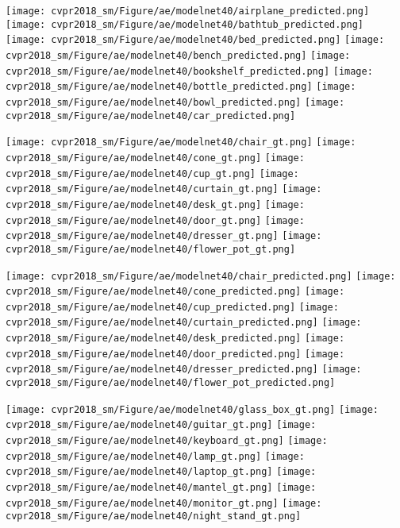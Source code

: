 \documentclass[10pt,twocolumn,letterpaper]{article}
\begin{document}
\begin{figure*}[t]
        \texttt{[image: cvpr2018\_sm/Figure/ae/modelnet40/airplane\_predicted.png]}
        \texttt{[image: cvpr2018\_sm/Figure/ae/modelnet40/bathtub\_predicted.png]}
        \texttt{[image: cvpr2018\_sm/Figure/ae/modelnet40/bed\_predicted.png]}
        \texttt{[image: cvpr2018\_sm/Figure/ae/modelnet40/bench\_predicted.png]}
        \texttt{[image: cvpr2018\_sm/Figure/ae/modelnet40/bookshelf\_predicted.png]}
        \texttt{[image: cvpr2018\_sm/Figure/ae/modelnet40/bottle\_predicted.png]}
        \texttt{[image: cvpr2018\_sm/Figure/ae/modelnet40/bowl\_predicted.png]}
        \texttt{[image: cvpr2018\_sm/Figure/ae/modelnet40/car\_predicted.png]}
        
        \texttt{[image: cvpr2018\_sm/Figure/ae/modelnet40/chair\_gt.png]}
        \texttt{[image: cvpr2018\_sm/Figure/ae/modelnet40/cone\_gt.png]}
        \texttt{[image: cvpr2018\_sm/Figure/ae/modelnet40/cup\_gt.png]}
        \texttt{[image: cvpr2018\_sm/Figure/ae/modelnet40/curtain\_gt.png]}
        \texttt{[image: cvpr2018\_sm/Figure/ae/modelnet40/desk\_gt.png]}
        \texttt{[image: cvpr2018\_sm/Figure/ae/modelnet40/door\_gt.png]}
        \texttt{[image: cvpr2018\_sm/Figure/ae/modelnet40/dresser\_gt.png]}
        \texttt{[image: cvpr2018\_sm/Figure/ae/modelnet40/flower\_pot\_gt.png]}
        
        \texttt{[image: cvpr2018\_sm/Figure/ae/modelnet40/chair\_predicted.png]}
        \texttt{[image: cvpr2018\_sm/Figure/ae/modelnet40/cone\_predicted.png]}
        \texttt{[image: cvpr2018\_sm/Figure/ae/modelnet40/cup\_predicted.png]}
        \texttt{[image: cvpr2018\_sm/Figure/ae/modelnet40/curtain\_predicted.png]}
        \texttt{[image: cvpr2018\_sm/Figure/ae/modelnet40/desk\_predicted.png]}
        \texttt{[image: cvpr2018\_sm/Figure/ae/modelnet40/door\_predicted.png]}
        \texttt{[image: cvpr2018\_sm/Figure/ae/modelnet40/dresser\_predicted.png]}
        \texttt{[image: cvpr2018\_sm/Figure/ae/modelnet40/flower\_pot\_predicted.png]}
        
        \texttt{[image: cvpr2018\_sm/Figure/ae/modelnet40/glass\_box\_gt.png]}
        \texttt{[image: cvpr2018\_sm/Figure/ae/modelnet40/guitar\_gt.png]}
        \texttt{[image: cvpr2018\_sm/Figure/ae/modelnet40/keyboard\_gt.png]}
        \texttt{[image: cvpr2018\_sm/Figure/ae/modelnet40/lamp\_gt.png]}
        \texttt{[image: cvpr2018\_sm/Figure/ae/modelnet40/laptop\_gt.png]}
        \texttt{[image: cvpr2018\_sm/Figure/ae/modelnet40/mantel\_gt.png]}
        \texttt{[image: cvpr2018\_sm/Figure/ae/modelnet40/monitor\_gt.png]}
        \texttt{[image: cvpr2018\_sm/Figure/ae/modelnet40/night\_stand\_gt.png]}
        

\end{figure*}
\end{document}
